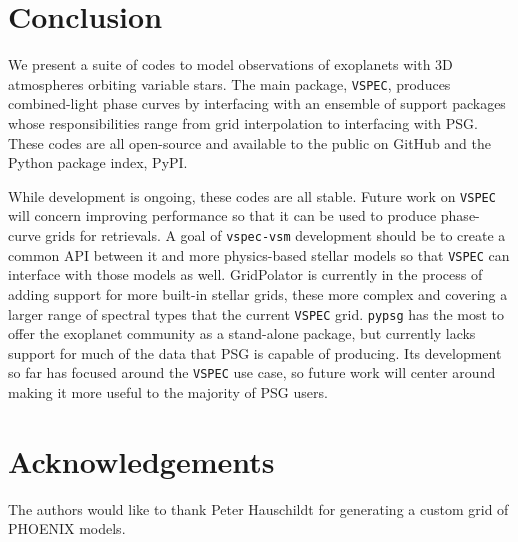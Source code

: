 \documentclass[twocolumn]{aastex631}
\newcommand{\vspec}[1]{\texttt{VSPEC}#1}
\begin{document}


\section{Conclusion}
\label{sec:conclusion}
We present a suite of codes to model observations of exoplanets with 3D atmospheres orbiting variable stars. The main package, \vspec{}, produces combined-light phase curves by interfacing with an ensemble of support packages whose responsibilities range from grid interpolation to interfacing with PSG. These codes are all open-source and available to the public on GitHub and the Python package index, PyPI.

While development is ongoing, these codes are all stable. Future work on \vspec{} will concern improving performance so that it can be used to produce phase-curve grids for retrievals. A goal of \texttt{vspec-vsm} development should be to create a common API between it and more physics-based stellar models so that \vspec{} can interface with those models as well. GridPolator is currently in the process of adding support for more built-in stellar grids, these more complex and covering a larger range of spectral types that the current \vspec{} grid. \texttt{pypsg} has the most to offer the exoplanet community as a stand-alone package, but currently lacks support for much of the data that PSG is capable of producing. Its development so far has focused around the \vspec{} use case, so future work will center around making it more useful to the majority of PSG users.


\section{Acknowledgements}
The authors would like to thank Peter Hauschildt for generating a custom grid of PHOENIX models.


\end{document}
